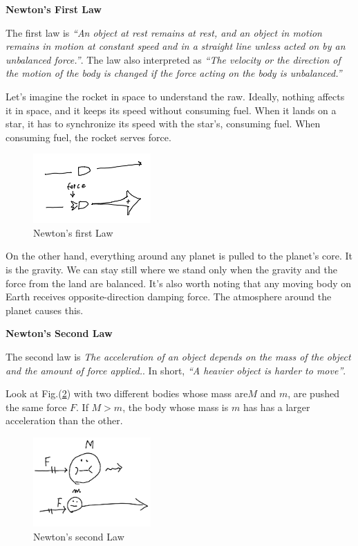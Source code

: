 \documentclass[pdflatex,sn-mathphys-num]{sn-jnl}%
\theoremstyle{thmstyleone}%
\theoremstyle{thmstyletwo}%
\theoremstyle{thmstylethree}%
\begin{document}
{\noindent\rm\bf\large Newton's First Law}

The first law is {\sl ``An object at rest remains at rest, and an object in motion remains in motion at constant speed and in a straight line unless acted on by an unbalanced force.''}. The law also interpreted as {\sl ``The velocity or the direction of the motion of the body is changed if the force acting on the body is unbalanced.''}

Let's imagine the rocket in space to understand the raw. Ideally, nothing affects it in space, and it keeps its speed without consuming fuel. When it lands on a star, it has to synchronize its speed with the star's, consuming fuel. When consuming fuel, the rocket serves force.

\begin{figure}[H]
	\centering
	\includegraphics[width=0.4\textwidth]{images/NewtonsFirstLaw.png}
	\caption{Newton's first Law}
	\label{NewF}
\end{figure}

On the other hand, everything around any planet is pulled to the planet's core. It is the gravity. We can stay still where we stand only when the gravity and the force from the land are balanced. It's also worth noting that any moving body on Earth receives opposite-direction damping force. The atmosphere around the planet causes this.\vspace{2truemm}

{\noindent\rm\bf\large Newton's Second Law}

The second law is {\sl The acceleration of an object depends on the mass of the object and the amount of force applied.}. In short, {\sl ``A heavier object is harder to move''}.

Look at Fig.(\ref{NewS}) with two different bodies whose mass are$M$ and $m$, are pushed the same force $F$. If $M > m$, the body whose mass is $m$ has has a larger acceleration than the other.

\begin{figure}[H]
	\centering
	\includegraphics[width=0.4\textwidth]{images/NewtonsSecondLaw.png}
	\caption{Newton's second Law}
	\label{NewS}
\end{figure}
\end{document}
